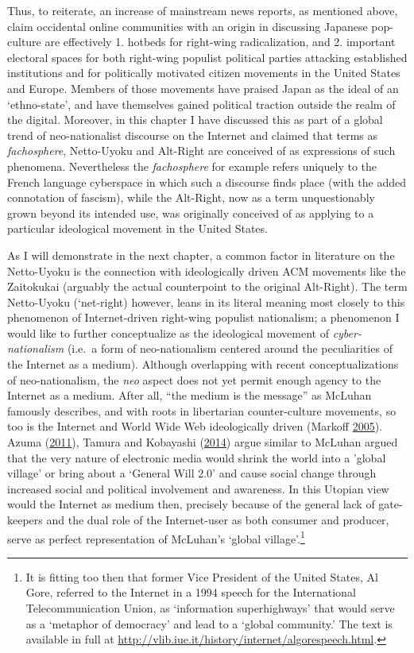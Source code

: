 \documentclass[10pt,british,A4paper,,openany]{memoir}
\begin{document}
Thus, to reiterate, an increase of mainstream news reports, as mentioned
above, claim occidental online communities with an origin in discussing
Japanese pop-culture are effectively 1. hotbeds for right-wing
radicalization, and 2. important electoral spaces for both right-wing
populist political parties attacking established institutions and for
politically motivated citizen movements in the United States and Europe.
Members of those movements have praised Japan as the ideal of an
`ethno-state', and have themselves gained political traction outside the
realm of the digital. Moreover, in this chapter I have discussed this as
part of a global trend of neo-nationalist discourse on the Internet and
claimed that terms as \emph{fachosphere}, Netto-Uyoku and Alt-Right are
conceived of as expressions of such phenomena. Nevertheless the
\emph{fachosphere} for example refers uniquely to the French language
cyberspace in which such a discourse finds place (with the added
connotation of fascism), while the Alt-Right, now as a term
unquestionably grown beyond its intended use, was originally conceived
of as applying to a particular ideological movement in the United
States.

As I will demonstrate in the next chapter, a common factor in literature
on the Netto-Uyoku is the connection with ideologically driven ACM
movements like the Zaitokukai (arguably the actual counterpoint to the
original Alt-Right). The term Netto-Uyoku (`net-right) however, leans in
its literal meaning most closely to this phenomenon of Internet-driven
right-wing populist nationalism; a phenomenon I would like to further
conceptualize as the ideological movement of \emph{cyber-nationalism}
(i.e.~a form of neo-nationalism centered around the peculiarities of the
Internet as a medium). Although overlapping with recent
conceptualizations of neo-nationalism, the \emph{neo} aspect does not
yet permit enough agency to the Internet as a medium. After all, ``the
medium is the message'' as McLuhan famously describes, and with roots in
libertarian counter-culture movements, so too is the Internet and World
Wide Web ideologically driven (Markoff
\protect\hyperlink{ref-markoff_what_2005}{2005}). Azuma
(\protect\hyperlink{ref-azuma_ippan_2011}{2011}), Tamura and Kobayashi
(\protect\hyperlink{ref-tamura_niggling_2014}{2014}) argue similar to
McLuhan argued that the very nature of electronic media would shrink the
world into a 'global village' or bring about a `General Will 2.0' and
cause social change through increased social and political involvement
and awareness. In this Utopian view would the Internet as medium then,
precisely because of the general lack of gate-keepers and the dual role
of the Internet-user as both consumer and producer, serve as perfect
representation of McLuhan's `global village'.\footnote{It is fitting too
  then that former Vice President of the United States, Al Gore,
  referred to the Internet in a 1994 speech for the International
  Telecommunication Union, as `information superhighways' that would
  serve as a `metaphor of democracy' and lead to a `global community.'
  The text is available in full at
  \url{http://vlib.iue.it/history/internet/algorespeech.html}.}
\end{document}

